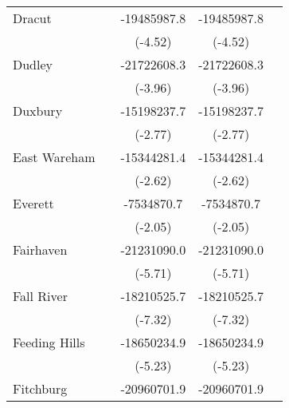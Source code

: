 {\begin{tabular}{l*{4}{c}}
\addlinespace
Dracut              &                     & -19485987.8\sym{***}& -19485987.8\sym{***}&                     \\
                    &                     &     (-4.52)         &     (-4.52)         &                     \\
\addlinespace
Dudley              &                     & -21722608.3\sym{***}& -21722608.3\sym{***}&                     \\
                    &                     &     (-3.96)         &     (-3.96)         &                     \\
\addlinespace
Duxbury             &                     & -15198237.7\sym{**} & -15198237.7\sym{**} &                     \\
                    &                     &     (-2.77)         &     (-2.77)         &                     \\
\addlinespace
East Wareham        &                     & -15344281.4\sym{**} & -15344281.4\sym{**} &                     \\
                    &                     &     (-2.62)         &     (-2.62)         &                     \\
\addlinespace
Everett             &                     &  -7534870.7\sym{*}  &  -7534870.7\sym{*}  &                     \\
                    &                     &     (-2.05)         &     (-2.05)         &                     \\
\addlinespace
Fairhaven           &                     & -21231090.0\sym{***}& -21231090.0\sym{***}&                     \\
                    &                     &     (-5.71)         &     (-5.71)         &                     \\
\addlinespace
Fall River          &                     & -18210525.7\sym{***}& -18210525.7\sym{***}&                     \\
                    &                     &     (-7.32)         &     (-7.32)         &                     \\
\addlinespace
Feeding Hills       &                     & -18650234.9\sym{***}& -18650234.9\sym{***}&                     \\
                    &                     &     (-5.23)         &     (-5.23)         &                     \\
\addlinespace
Fitchburg           &                     & -20960701.9\sym{***}& -20960701.9\sym{***}&                     \\

\end{tabular}}
